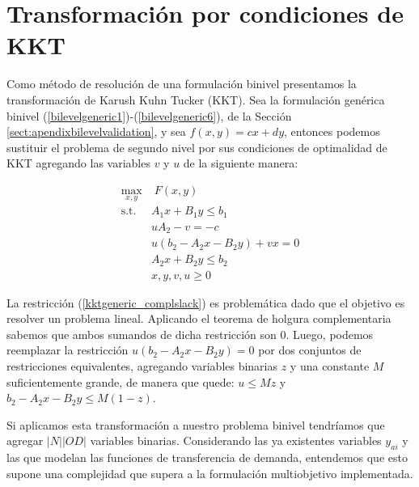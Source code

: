 \section{Transformación por condiciones de KKT}
\label{sec:kkttransform}

Como método de resolución de una formulación binivel presentamos la transformación de Karush Kuhn Tucker (KKT)\parencite{bardbookch5}. Sea la formulación genérica binivel (\ref{bilevelgeneric1})-(\ref{bilevelgeneric6}), de la Sección \ref{sect:apendixbilevelvalidation}, y sea $f(x, y) = cx + dy$, entonces podemos sustituir el problema de segundo nivel por sus condiciones de optimalidad de KKT agregando las variables $v$ y $u$ de la siguiente manera:

\begin{align}
\max_{x,y}              & \; F(x, y) \label{kktgeneric1} \\
\text{s.t.}             & A_1 x + B_1 y \leq b_1 \\
                        & uA_2 - v = -c \\
                        & u(b_2 - A_2x - B_2y) + vx = 0 \label{kktgeneric_complslack} \\
                        & A_2 x + B_2 y \leq b_2 \label{kktgeneric5} \\
                        & x, y, v, u \geq 0 \label{kktgeneric6}
\end{align}

La restricción (\ref{kktgeneric_complslack}) es problemática dado que el objetivo es resolver un problema lineal. Aplicando el teorema de holgura complementaria sabemos que ambos sumandos de dicha restricción son 0. Luego, podemos reemplazar la restricción $u(b_2 - A_2x - B_2y) = 0$ por dos conjuntos de restricciones equivalentes, agregando variables binarias $z$ y una constante $M$ suficientemente grande, de manera que quede: $u \leq Mz$ y $b_2 - A_2x - B_2y \leq M(1-z)$.

Si aplicamos esta transformación a nuestro problema binivel tendríamos que agregar $|N| |OD|$ variables binarias. Considerando las ya existentes variables $y_{ai}$ y las que modelan las funciones de transferencia de demanda, entendemos que esto supone una complejidad que supera a la formulación multiobjetivo implementada.
